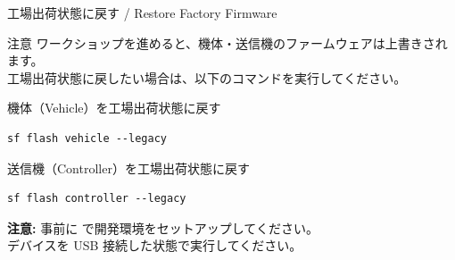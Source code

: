 \begin{frame}[fragile]{工場出荷状態に戻す / Restore Factory Firmware}
  \begin{alertblock}{注意}
    {\small ワークショップを進めると、機体・送信機のファームウェアは上書きされます。\\
    工場出荷状態に戻したい場合は、以下のコマンドを実行してください。}
  \end{alertblock}

  \vspace{-0.2em}

  \begin{block}{機体（Vehicle）を工場出荷状態に戻す}
  \begin{lstlisting}[style=sfcpp]
sf flash vehicle --legacy
  \end{lstlisting}
  \end{block}

  \vspace{-0.3em}

  \begin{block}{送信機（Controller）を工場出荷状態に戻す}
  \begin{lstlisting}[style=sfcpp]
sf flash controller --legacy
  \end{lstlisting}
  \end{block}

  \vspace{-0.2em}

  {\scriptsize
  \textbf{注意:} 事前に  で開発環境をセットアップしてください。\\
  デバイスを USB 接続した状態で実行してください。
  }
\end{frame}

